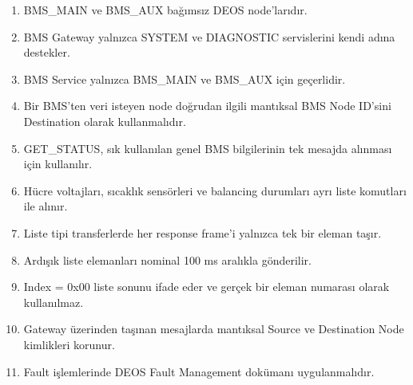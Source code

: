 \documentclass[a4paper,10pt]{article}
\begin{document}
\begin{enumerate}[nosep]

    \item BMS\_MAIN ve BMS\_AUX bağımsız DEOS node'larıdır.

    \item BMS Gateway yalnızca SYSTEM ve DIAGNOSTIC servislerini
    kendi adına destekler.

    \item BMS Service yalnızca BMS\_MAIN ve BMS\_AUX için geçerlidir.

    \item Bir BMS'ten veri isteyen node doğrudan ilgili mantıksal
    BMS Node ID'sini Destination olarak kullanmalıdır.

    \item GET\_STATUS, sık kullanılan genel BMS bilgilerinin tek
    mesajda alınması için kullanılır.

    \item Hücre voltajları, sıcaklık sensörleri ve balancing durumları
    ayrı liste komutları ile alınır.

    \item Liste tipi transferlerde her response frame'i yalnızca
    tek bir eleman taşır.

    \item Ardışık liste elemanları nominal 100 ms aralıkla gönderilir.

    \item Index = 0x00 liste sonunu ifade eder ve gerçek bir eleman
    numarası olarak kullanılmaz.

    \item Gateway üzerinden taşınan mesajlarda mantıksal Source ve
    Destination Node kimlikleri korunur.

    \item Fault işlemlerinde DEOS Fault Management dokümanı
    uygulanmalıdır.

\end{enumerate}
\end{document}

